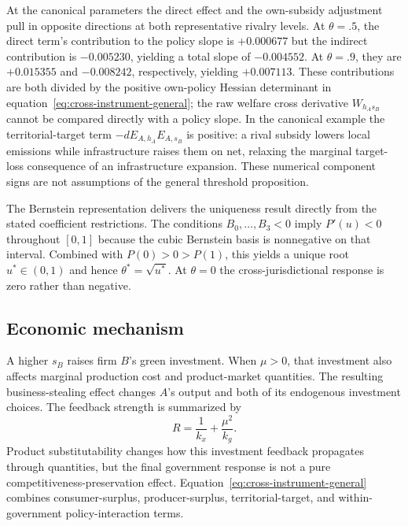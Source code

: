 At the canonical parameters the direct effect and the own-subsidy adjustment pull in opposite directions at both representative rivalry levels. At $\theta=.5$, the direct term's contribution to the policy slope is $+0.000677$ but the indirect contribution is $-0.005230$, yielding a total slope of $-0.004552$. At $\theta=.9$, they are $+0.015355$ and $-0.008242$, respectively, yielding $+0.007113$. These contributions are both divided by the positive own-policy Hessian determinant in equation~\eqref{eq:cross-instrument-general}; the raw welfare cross derivative $W_{h_As_B}$ cannot be compared directly with a policy slope. In the canonical example the territorial-target term $-dE_{A,h_A}E_{A,s_B}$ is positive: a rival subsidy lowers local emissions while infrastructure raises them on net, relaxing the marginal target-loss consequence of an infrastructure expansion. These numerical component signs are not assumptions of the general threshold proposition.

The Bernstein representation delivers the uniqueness result directly from the stated coefficient restrictions. The conditions $B_0,\ldots,B_3<0$ imply $P'(u)<0$ throughout $[0,1]$ because the cubic Bernstein basis is nonnegative on that interval. Combined with $P(0)>0>P(1)$, this yields a unique root $u^*\in(0,1)$ and hence $\theta^*=\sqrt{u^*}$. At $\theta=0$ the cross-jurisdictional response is zero rather than negative.

\subsection{Economic mechanism}

A higher $s_B$ raises firm $B$'s green investment. When $\mu>0$, that investment also affects marginal production cost and product-market quantities. The resulting business-stealing effect changes $A$'s output and both of its endogenous investment choices. The feedback strength is summarized by
\[
R=\frac1{k_x}+\frac{\mu^2}{k_g}.
\]
Product substitutability changes how this investment feedback propagates through quantities, but the final government response is not a pure competitiveness-preservation effect. Equation~\eqref{eq:cross-instrument-general} combines consumer-surplus, producer-surplus, territorial-target, and within-government policy-interaction terms.

